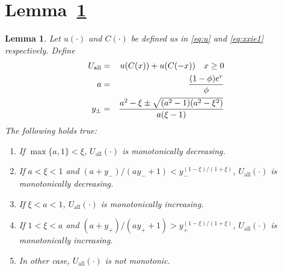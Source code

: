 \documentclass[11pt,a4]{amsart}
\newtheorem{lemma}{Lemma}[section]
\newcommand{\1}{{\mathbf 1}}
\begin{document}
\section{Lemma~\ref{lemma:III}}
\setcounter{equation}{0}
\begin{lemma}\label{lemma:III}
Let $u(\cdot)$  and $C(\cdot)$ be defined as in \eqref{eq:u} and
\eqref{eq:xxie1} respectively. Define
\begin{eqnarray*}
U_{\text{all}} &=& u(C(x))
+ u(C(-x))
\quad
x \geq 0 \\
a &=& {
  (1 - \phi) e^r
  \over
  \phi
} \\
y_\pm &=& {
  a^2 - \xi \pm \sqrt{(a^2 - 1) (a^2 - \xi^2)}
  \over
  a (\xi - 1)
}
\end{eqnarray*}
The following holds true:
\begin{enumerate}
\item If $\max\{a, 1\} < \xi$, $U_{\text{all}}(\cdot)$ is
  monotonically decreasing.
\item If $a < \xi < 1$ and $(a + y_-)/(a y_- + 1) <
  y_-^{(1-\xi)/(1+\xi)}$, $U_{\text{all}}(\cdot)$ is monotonically
  decreasing.
\item If $\xi < a < 1$, $U_{\text{all}}(\cdot)$ is monotonically
  increasing.
\item If $1 < \xi < a$ and $(a + y_+)/(a y_+ + 1) >
  y_+^{(1-\xi)/(1+\xi)}$, $U_{\text{all}}(\cdot)$ is monotonically
  increasing.
\item In other case, $U_{\text{all}}(\cdot)$ is not monotonic.
\end{enumerate}
\end{lemma}
\end{document}
